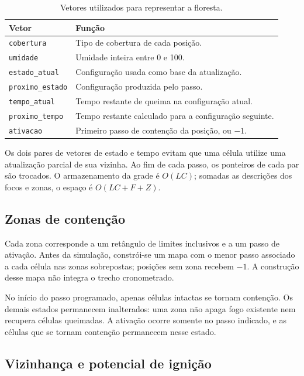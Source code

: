 \documentclass[12pt,a4paper]{article}
\begin{document}
\begin{table}[H]
\centering
\caption{Vetores utilizados para representar a floresta.}
\label{tab:vetores}
\begin{tabularx}{\linewidth}{lX}
\toprule
\textbf{Vetor} & \textbf{Função} \\
\midrule
\texttt{cobertura} & Tipo de cobertura de cada posição. \\
\texttt{umidade} & Umidade inteira entre 0 e 100. \\
\texttt{estado\_atual} & Configuração usada como base da atualização. \\
\texttt{proximo\_estado} & Configuração produzida pelo passo. \\
\texttt{tempo\_atual} & Tempo restante de queima na configuração atual. \\
\texttt{proximo\_tempo} & Tempo restante calculado para a configuração seguinte. \\
\texttt{ativacao} & Primeiro passo de contenção da posição, ou $-1$. \\
\bottomrule
\end{tabularx}
\end{table}

Os dois pares de vetores de estado e tempo evitam que uma célula utilize
uma atualização parcial de sua vizinha. Ao fim de cada passo, os
ponteiros de cada par são trocados. O armazenamento da grade é $O(LC)$; somadas as
descrições dos focos e zonas, o espaço é $O(LC+F+Z)$.

\subsection{Zonas de contenção}

Cada zona corresponde a um retângulo de limites inclusivos e a um passo
de ativação. Antes da simulação, constrói-se um mapa com o menor passo
associado a cada célula nas zonas sobrepostas; posições sem zona recebem
$-1$. A construção desse mapa não integra o trecho cronometrado.

No início do passo programado, apenas células intactas se tornam contenção.
Os demais estados permanecem inalterados: uma zona não apaga fogo existente
nem recupera células queimadas. A ativação ocorre somente no passo indicado,
e as células que se tornam contenção permanecem nesse estado.

\subsection{Vizinhança e potencial de ignição}
\end{document}
